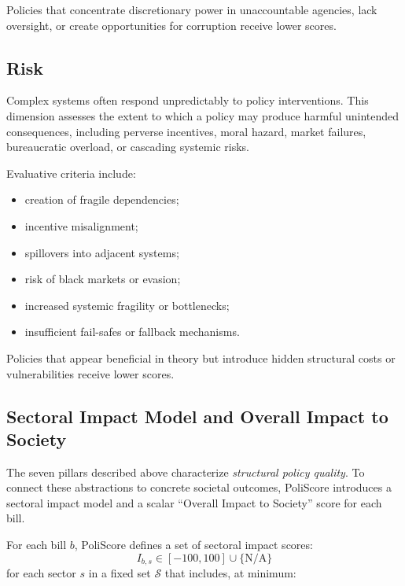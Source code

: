 \documentclass[12pt]{article}
\begin{document}
Policies that concentrate discretionary power in unaccountable agencies, lack oversight, or create opportunities for
corruption receive lower scores.

\subsection{Risk}

Complex systems often respond unpredictably to policy interventions. This dimension assesses the extent to which a policy
may produce harmful unintended consequences, including perverse incentives, moral hazard, market failures, bureaucratic
overload, or cascading systemic risks.

Evaluative criteria include:
\begin{itemize}
    \item creation of fragile dependencies;
    \item incentive misalignment;
    \item spillovers into adjacent systems;
    \item risk of black markets or evasion;
    \item increased systemic fragility or bottlenecks;
    \item insufficient fail-safes or fallback mechanisms.
\end{itemize}

Policies that appear beneficial in theory but introduce hidden structural costs or vulnerabilities receive lower scores.

\subsection{Sectoral Impact Model and Overall Impact to Society}
\label{subsec:sectoral}

The seven pillars described above characterize \emph{structural policy quality}. To connect these abstractions to concrete
societal outcomes, PoliScore introduces a sectoral impact model and a scalar ``Overall Impact to Society'' score for each
bill.

For each bill \(b\), PoliScore defines a set of sectoral impact scores:
\[
I_{b,s} \in [-100, 100] \cup \{\text{N/A}\}
\]
for each sector \(s\) in a fixed set \(\mathcal{S}\) that includes, at minimum:
\end{document}

